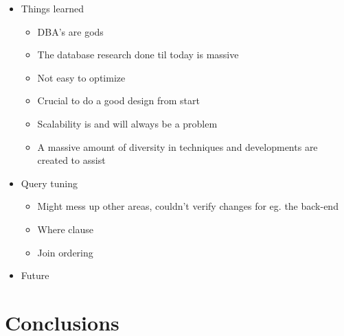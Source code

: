 \documentclass{cslthse-msc}
\begin{document}
\begin{itemize}

\item Things learned
	\begin{itemize}
	\item DBA's are gods
	\item The database research done til today is massive
	\item Not easy to optimize 
	\item Crucial to do a good design from start
	\item Scalability is and will always be a problem
	\item A massive amount of diversity in techniques and developments are created to assist
	\end{itemize}


\item Query tuning
	\begin{itemize}
	\item Might mess up other areas, couldn't verify changes for eg. the back-end
	\item Where clause
	\item Join ordering
	\end{itemize}

\item Future
\end{itemize}

\chapter{Conclusions}\label{sec:conclusions}




\end{document}
